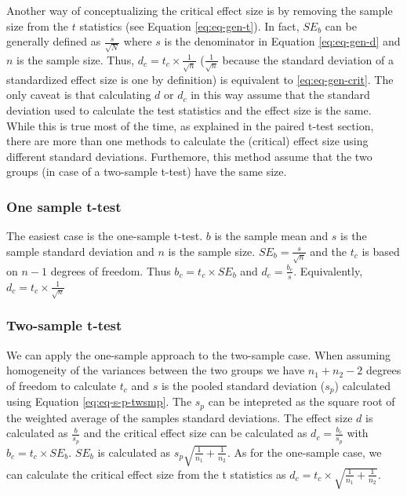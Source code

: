 \documentclass[
  man]{apa7}
\begin{document}
Another way of conceptualizing the critical effect size is by removing the sample size from the \(t\) statistics (see Equation \eqref{eq:eq-gen-t}). In fact, \(SE_b\) can be generally defined as \(\frac{s}{\sqrt{N}}\) where \(s\) is the denominator in Equation \eqref{eq:eq-gen-d} and \(n\) is the sample size. Thus, \(d_c = t_c \times \frac{1}{\sqrt{n}}\) (\(\frac{1}{\sqrt{n}}\) because the standard deviation of a standardized effect size is one by definition) is equivalent to \eqref{eq:eq-gen-crit}. The only caveat is that calculating \(d\) or \(d_c\) in this way assume that the standard deviation used to calculate the test statistics and the effect size is the same. While this is true most of the time, as explained in the paired t-test section, there are more than one methods to calculate the (critical) effect size using different standard deviations. Furthemore, this method assume that the two groups (in case of a two-sample t-test) have the same size.

\hypertarget{one-sample-t-test}{%
\subsubsection{One sample t-test}\label{one-sample-t-test}}

The easiest case is the one-sample t-test. \(b\) is the sample mean and \(s\) is the sample standard deviation and \(n\) is the sample size. \(SE_b = \frac{s}{\sqrt{n}}\) and the \(t_c\) is based on \(n - 1\) degrees of freedom. Thus \(b_c = t_c \times SE_b\) and \(d_c = \frac{b_c}{s}\). Equivalently, \(d_c = t_c \times \frac{1}{\sqrt{n}}\)

\hypertarget{two-sample-t-test}{%
\subsubsection{Two-sample t-test}\label{two-sample-t-test}}

We can apply the one-sample approach to the two-sample case. When assuming homogeneity of the variances between the two groups we have \(n_1 + n_2 - 2\) degrees of freedom to calculate \(t_c\) and \(s\) is the pooled standard deviation (\(s_p\)) calculated using Equation \eqref{eq:eq-s-p-twsmp}. The \(s_p\) can be intepreted as the square root of the weighted average of the samples standard deviations. The effect size \(d\) is calculated as \(\frac{b}{s_p}\) and the critical effect size can be calculated as \(d_c = \frac{b_c}{s_p}\) with \(b_c = t_c \times SE_b\). \(SE_b\) is calculated as \(s_p \sqrt{\frac{1}{n_1} + \frac{1}{n_2}}\). As for the one-sample case, we can calculate the critical effect size from the t statistics as \(d_c = t_c \times \sqrt{\frac{1}{n_1} + \frac{1}{n_2}}\).
\end{document}

